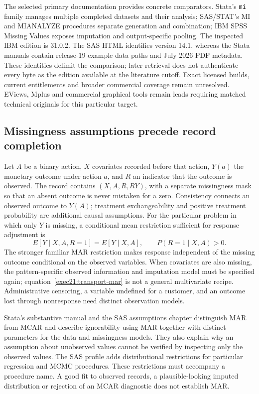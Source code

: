 The selected primary documentation provides concrete comparators. Stata's
\texttt{mi} family manages multiple completed datasets and their analysis;
SAS/STAT's MI and MIANALYZE procedures separate generation and combination;
IBM SPSS Missing Values exposes imputation and output-specific pooling.
The inspected IBM edition is 31.0.2. The SAS HTML identifies version 14.1,
whereas the Stata manuals contain release-19 example-data paths and July 2026
PDF metadata. These identities delimit the comparison; later retrieval does
not authenticate every byte as the edition available at the literature cutoff.
Exact licensed builds, current entitlements and broader commercial coverage
remain unresolved. EViews, Mplus and commercial graphical tools remain leads
requiring matched technical originals for this particular target.
\cite{exec21_transport_stata_mi,exec21_transport_sas_mi_intro,exec21_transport_spss_missing}

\subsection{Missingness assumptions precede record completion}
\label{exec21:transport-missingness}

Let $A$ be a binary action, $X$ covariates recorded before that action, $Y(a)$
the monetary outcome under action $a$, and $R$ an indicator that the outcome is
observed. The record contains $(X,A,R,RY)$, with a separate missingness mask so
that an absent outcome is never mistaken for a zero. Consistency connects an
observed outcome to $Y(A)$; treatment exchangeability and positive treatment
probability are additional causal assumptions. For the particular problem in
which only $Y$ is missing, a conditional mean restriction sufficient for response
adjustment is
\begin{equation}
 E[Y\mid X,A,R=1]=E[Y\mid X,A],\qquad
 P(R=1\mid X,A)>0.
 \label{exec21:transport-mar}
\end{equation}
The stronger familiar MAR restriction makes response independent of the missing
outcome conditional on the observed variables. When covariates are also missing,
the pattern-specific observed information and imputation model must be specified
again; equation~\eqref{exec21:transport-mar} is not a general multivariate recipe.
Administrative censoring, a variable undefined for a customer, and an outcome
lost through nonresponse need distinct observation models.

Stata's substantive manual and the SAS assumptions chapter distinguish MAR
from MCAR and describe ignorability using MAR together with distinct parameters
for the data and missingness models. They also explain why an assumption about
unobserved values cannot be verified by inspecting only the observed values.
The SAS profile adds distributional restrictions for particular regression and
MCMC procedures. These restrictions must accompany a procedure name. A good
fit to observed records, a plausible-looking imputed distribution or rejection
of an MCAR diagnostic does not establish MAR.
\cite{exec21_transport_stata_substantive,exec21_transport_sas_assumptions}

